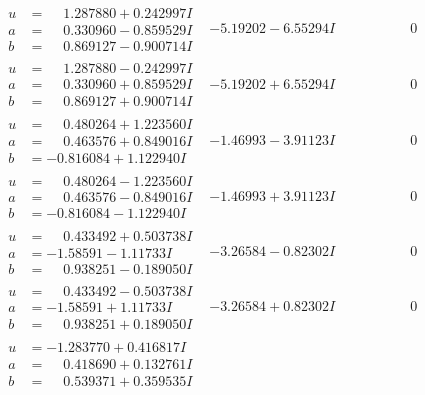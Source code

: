 \documentclass[1p]{elsarticle_modified}
\theoremstyle{definition}
\begin{document}
$$\begin{array}{c|c|c}
\begin{aligned}
u &= \phantom{-}1.287880 + 0.242997 I \\
a &= \phantom{-}0.330960 - 0.859529 I \\
b &= \phantom{-}0.869127 - 0.900714 I\end{aligned}
 & -5.19202 - 6.55294 I & \phantom{-0.000000 } 0 \\ \hline\begin{aligned}
u &= \phantom{-}1.287880 - 0.242997 I \\
a &= \phantom{-}0.330960 + 0.859529 I \\
b &= \phantom{-}0.869127 + 0.900714 I\end{aligned}
 & -5.19202 + 6.55294 I & \phantom{-0.000000 } 0 \\ \hline\begin{aligned}
u &= \phantom{-}0.480264 + 1.223560 I \\
a &= \phantom{-}0.463576 + 0.849016 I \\
b &= -0.816084 + 1.122940 I\end{aligned}
 & -1.46993 - 3.91123 I & \phantom{-0.000000 } 0 \\ \hline\begin{aligned}
u &= \phantom{-}0.480264 - 1.223560 I \\
a &= \phantom{-}0.463576 - 0.849016 I \\
b &= -0.816084 - 1.122940 I\end{aligned}
 & -1.46993 + 3.91123 I & \phantom{-0.000000 } 0 \\ \hline\begin{aligned}
u &= \phantom{-}0.433492 + 0.503738 I \\
a &= -1.58591 - 1.11733 I \\
b &= \phantom{-}0.938251 - 0.189050 I\end{aligned}
 & -3.26584 - 0.82302 I & \phantom{-0.000000 } 0 \\ \hline\begin{aligned}
u &= \phantom{-}0.433492 - 0.503738 I \\
a &= -1.58591 + 1.11733 I \\
b &= \phantom{-}0.938251 + 0.189050 I\end{aligned}
 & -3.26584 + 0.82302 I & \phantom{-0.000000 } 0 \\ \hline\begin{aligned}
u &= -1.283770 + 0.416817 I \\
a &= \phantom{-}0.418690 + 0.132761 I \\
b &= \phantom{-}0.539371 + 0.359535 I\end{aligned}

\end{array}$$
\end{document}
